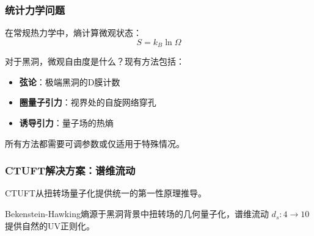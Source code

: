 \subsubsection{统计力学问题}

在常规热力学中，熵计算微观状态：
\begin{equation}
S = k_B \ln \Omega
\end{equation}

对于黑洞，微观自由度是什么？现有方法包括：
\begin{itemize}
    \item \textbf{弦论}：极端黑洞的D膜计数
    \item \textbf{圈量子引力}：视界处的自旋网络穿孔
    \item \textbf{诱导引力}：量子场的热熵
\end{itemize}

所有方法都需要可调参数或仅适用于特殊情况。

\subsubsection{CTUFT解决方案：谱维流动}

CTUFT从扭转场量子化提供统一的第一性原理推导。

\begin{theorem}[来自扭转场量子化的黑洞熵]
\label{thm:bh_entropy_zh}
Bekenstein-Hawking熵源于黑洞背景中扭转场的几何量子化，谱维流动 $d_s: 4 \to 10$ 提供自然的UV正则化。
\end{theorem}

